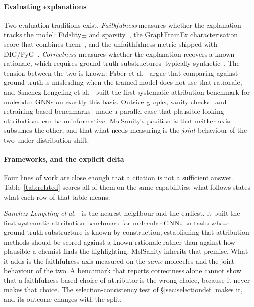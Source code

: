 \paragraph{Evaluating explanations} Two evaluation traditions exist.
\emph{Faithfulness} measures whether the explanation tracks the model:
Fidelity$\pm$ and sparsity~\cite{gnnsurvey}, the GraphFramEx characterisation
score that combines them~\cite{graphframex}, and the unfaithfulness metric
shipped with DIG/PyG~\cite{dig}. \emph{Correctness} measures whether the
explanation recovers a known rationale, which requires ground-truth
substructures, typically synthetic~\cite{graphxai}. The tension between the
two is known: Faber et al.~\cite{faber} argue that comparing against ground
truth is misleading when the trained model does not use that rationale, and
Sanchez-Lengeling et al.~\cite{sanchez2020} built the first systematic
attribution benchmark for molecular GNNs on exactly this basis. Outside graphs,
sanity checks~\cite{sanitychecks} and retraining-based benchmarks~\cite{roar}
made a parallel case that plausible-looking attributions can be uninformative.
MolSanity's position is that neither axis subsumes the other, and that what
needs measuring is the \emph{joint} behaviour of the two under distribution
shift.

\paragraph{Frameworks, and the explicit delta} Four lines of work are close
enough that a citation is not a sufficient answer. Table~\ref{tab:related}
scores all of them on the same capabilities; what follows states what each row
of that table means.

\emph{Sanchez-Lengeling et al.}~\cite{sanchez2020} is the nearest
neighbour and the earliest. It built the first systematic attribution benchmark
for molecular GNNs on tasks whose ground-truth substructure is known by
construction, establishing that attribution methods should be scored against a
known rationale rather than against how plausible a chemist finds the
highlighting. MolSanity inherits that premise. What it adds is the faithfulness
axis measured on the \emph{same} molecules and the joint behaviour of the two.
A benchmark that reports correctness alone cannot show that a faithfulness-based
choice of attributor is the wrong choice, because it never makes that choice.
The selection-consistency test of \S\ref{sec:selectiondef} makes it, and its
outcome changes with the split.

